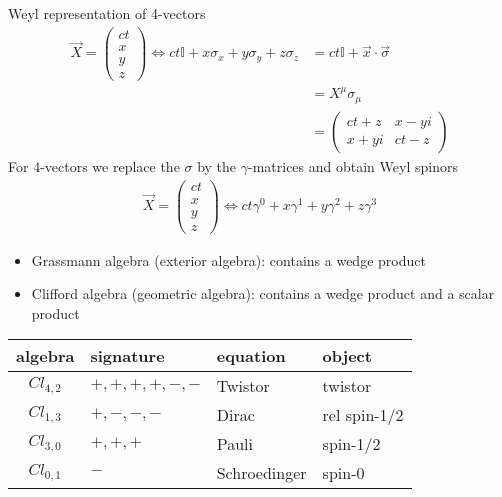 \documentclass[../main.tex]{subfiles}
\begin{document}
Weyl representation of 4-vectors
\begin{align}
\vec{X}=
\left(
\begin{matrix}
ct\\
x\\
y\\
z
\end{matrix}
\right)
\Longleftrightarrow
ct\mathbb{I}+x\sigma_x+y\sigma_y+z\sigma_z
&=ct\mathbb{I}+\vec{x}\cdot\vec{\sigma}\\
&=X^\mu\sigma_\mu\\
&=\left(
\begin{matrix}
ct+z    & x-yi\\
x+yi &  ct-z
\end{matrix}
\right)
\end{align}
For 4-vectors we replace the $\sigma$ by the $\gamma$-matrices and obtain Weyl spinors
\begin{align}
\vec{X}=
\left(
\begin{matrix}
ct\\
x\\
y\\
z
\end{matrix}
\right)
\Longleftrightarrow
ct\gamma^0+x\gamma^1+y\gamma^2+z\gamma^3
\end{align}
 
\begin{itemize}
\item Grassmann algebra (exterior algebra): contains a wedge product
\item Clifford algebra (geometric algebra): contains a wedge product and a scalar product
\end{itemize}

\begin{center}
\begin{tabular}{ c lll}
 algebra    & signature     & equation     & object  \\ \hline  
 $Cl_{4,2}$ & $+,+,+,+,-,-$ & Twistor      & twistor \\  
 $Cl_{1,3}$ & $+,-,-,-$     & Dirac        & rel spin-1/2 \\  
 $Cl_{3,0}$ & $+,+,+$       & Pauli        & spin-1/2 \\  
 $Cl_{0,1}$ & $-$           & Schroedinger & spin-0   
\end{tabular}
\end{center}
\end{document}
